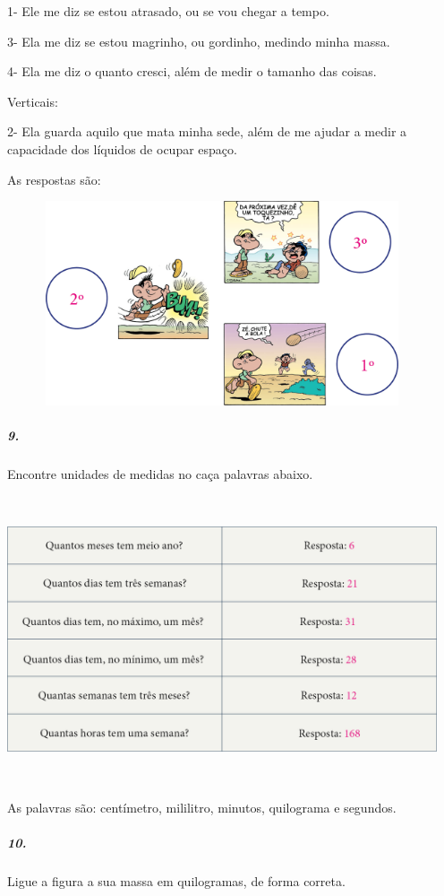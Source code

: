1- Ele me diz se estou atrasado, ou se vou chegar a tempo.

3- Ela me diz se estou magrinho, ou gordinho, medindo minha massa.

4- Ela me diz o quanto cresci, além de medir o tamanho das coisas.

Verticais:

2- Ela guarda aquilo que mata minha sede, além de me ajudar a medir a
capacidade dos líquidos de ocupar espaço.

As respostas são:

\includegraphics[width=5.00000in,height=2.37500in]{media/image49.png}

\subparagraph{9.}\label{section-36}

Encontre unidades de medidas no caça palavras abaixo.

\includegraphics[width=5.00000in,height=3.32292in]{media/image50.png}

As palavras são: centímetro, mililitro, minutos, quilograma e segundos.

\subparagraph{10.}\label{section-37}

Ligue a figura a sua massa em quilogramas, de forma correta.

